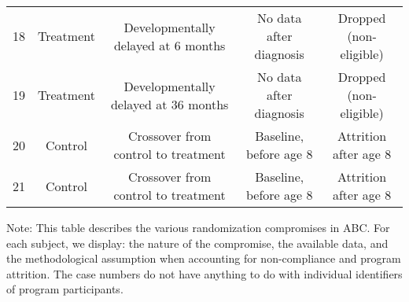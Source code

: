 \begin{sidewaystable}[H]
\begin{threeparttable}
\begin{tabular}{lcccc}
18& Treatment       & Developmentally delayed at 6 months & No data after diagnosis & Dropped (non-eligible) \\ 
19&Treatment       & Developmentally delayed at 36 months & No data after diagnosis & Dropped (non-eligible) \\ \midrule
20&Control       & Crossover from control to treatment & Baseline, before age 8 & Attrition after age 8 \\ 
21&Control       & Crossover from control to treatment & Baseline, before age 8 & Attrition after age 8   \\ \bottomrule
\end{tabular}
\begin{tablenotes}
\item Note: This table describes the various randomization compromises in ABC. For each subject, we display: the nature of the compromise, the available data, and the methodological assumption when accounting for non-compliance and program attrition. The case numbers do not have anything to do with individual identifiers of program participants. 
\end{tablenotes}
\end{threeparttable}
\end{sidewaystable}